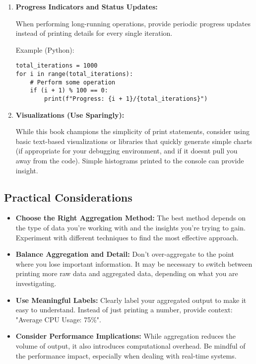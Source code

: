 \documentclass{article}
\begin{document}
{{{\begin{enumerate}
\item \textbf{Progress Indicators and Status Updates:}

When performing long-running operations, provide periodic progress updates instead of printing details for every single iteration.

Example (Python):

\begin{verbatim}
total_iterations = 1000
for i in range(total_iterations):
    # Perform some operation
    if (i + 1) % 100 == 0:
        print(f"Progress: {i + 1}/{total_iterations}")
\end{verbatim}

\item \textbf{Visualizations (Use Sparingly):}

While this book champions the simplicity of print statements, consider using basic text-based visualizations or libraries that quickly generate simple charts (if appropriate for your debugging environment, and if it doesnt pull you away from the code).  Simple histograms printed to the console can provide insight.

\end{enumerate}

\subsection*{Practical Considerations}

\begin{itemize}
\item \textbf{Choose the Right Aggregation Method:} The best method depends on the type of data you're working with and the insights you're trying to gain. Experiment with different techniques to find the most effective approach.
\item \textbf{Balance Aggregation and Detail:} Don't over-aggregate to the point where you lose important information.  It may be necessary to switch between printing more raw data and aggregated data, depending on what you are investigating.
\item \textbf{Use Meaningful Labels:} Clearly label your aggregated output to make it easy to understand. Instead of just printing a number, provide context: "Average CPU Usage: 75\%".
\item \textbf{Consider Performance Implications:} While aggregation reduces the volume of output, it also introduces computational overhead. Be mindful of the performance impact, especially when dealing with real-time systems.
\end{itemize}

}}}
\end{document}

